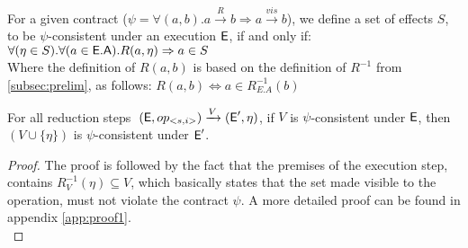 %
%
\begin{definition}
For a given contract ($\psi=\forall(a,b). a
\xrightarrow{R} b \Rightarrow a \xrightarrow{vis} b $), we define a set
of effects $S$, to be  $\psi$-consistent under an execution ${\normalfont \textsf{E}}$, if and
only if: 
$\forall (\eta \in S). \forall(a\in {\normalfont \textsf{E}}.{\normalfont \textsf{A}}). R(a,\eta)
\Rightarrow a \in S$ 
\\Where the definition of $R(a,b)$ is based on the definition of $R^{-1}$ from
\ref{subsec:prelim}, as follows: $R(a,b) \iff a \in R_{E.A}^{-1}(b)  $
\end{definition}

\begin{theorem}
\label{theorem:one}
For all reduction steps 
$
\; ({\normalfont \textsf{E}},op_{<s,i>}) 
    \xrightarrow{V}
  ({\normalfont \textsf{E}}',\eta)  
$,
if $V$ is $\psi$-consistent under ${\normalfont \textsf{E}}$, then $(V\cup\{\eta\})$ is
$\psi$-consistent under ${\normalfont \textsf{E}}'$.
\end{theorem}
\begin{proof}
The proof is followed by the fact that the premises of the execution
step, contains $R_V^{-1}(\eta)\subseteq V$, which basically states that the set made visible to
the operation, must not violate the contract $\psi$. A more detailed proof can
be found in appendix \ref{app:proof1}.
\\
\end{proof}





